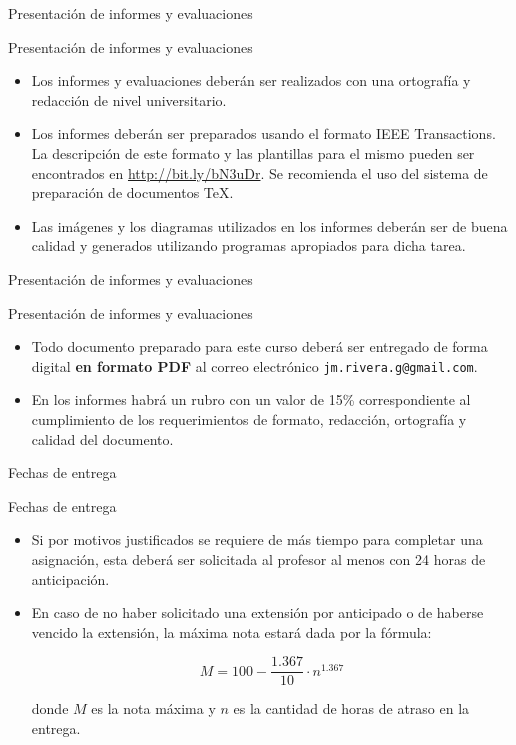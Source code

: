 \documentclass[xcolor=dvipsnames,handout]{beamer}
\begin{document}
\begin{frame}{Presentación de informes y evaluaciones}
\begin{block}{Presentación de informes y evaluaciones}
  \begin{itemize}[<+->]
    \item Los informes y evaluaciones deberán ser realizados con una ortografía y redacción de nivel universitario.
    \item Los informes deberán ser preparados usando el formato IEEE Transactions. La descripción de este formato y las plantillas para el mismo pueden ser encontrados en \url{http://bit.ly/bN3uDr}. Se recomienda el uso del sistema de preparación de documentos \TeX. 
    \item Las imágenes y los diagramas utilizados en los informes deberán ser de buena calidad y generados utilizando programas apropiados para dicha tarea.
  \end{itemize}
\end{block}
\end{frame}


\begin{frame}{Presentación de informes y evaluaciones}
\begin{block}{Presentación de informes y evaluaciones}
  \begin{itemize}[<+->]
    \item Todo documento preparado para este curso deberá ser entregado de forma digital \textbf{en formato PDF} al correo electrónico \texttt{jm.rivera.g@gmail.com}.
    \item En los informes habrá un rubro con un valor de 15\% correspondiente al cumplimiento de los requerimientos de formato, redacción, ortografía y calidad del documento.
  \end{itemize}
\end{block}
\end{frame}

\begin{frame}{Fechas de entrega}

\begin{block}{Fechas de entrega}
  \begin{itemize}[<+->]
    \item Si por motivos justificados se requiere de más tiempo para completar una asignación, esta deberá ser solicitada al profesor al menos con 24 horas de anticipación.
    \item En caso de no haber solicitado una extensión por anticipado o de haberse vencido la extensión, la máxima nota estará dada por la fórmula:

      \[ M = 100-\frac{1.367}{10}\cdot n^{1.367} \]

    donde $M$ es la nota máxima y $n$ es la cantidad de horas de atraso en la entrega.
  \end{itemize}
\end{block}
\end{frame}
\end{document}
